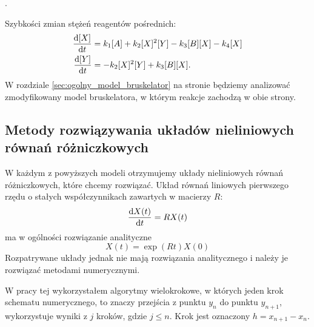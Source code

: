 \documentclass[10pt, a4paper, twoside, onecolumn]{article}
\numberwithin{equation}{section}
\begin{document}
	\begin{center}
		.
	\end{center}
	Szybkości zmian stężeń reagentów pośrednich: 
	\begin{equation}\label{bruskelator_pochodne}
	\begin{split}
		\dv{[X]}{t} &= k_{1}[A]+k_{2}[X]^{2}[Y]-k_{3}[B][X]-k_{4}[X] \\
		\dv{[Y]}{t} &= -k_{2}[X]^{2}[Y]+k_{3}[B][X].
	\end{split}
	\end{equation}
	W rozdziale \ref{sec:ogolny_model_bruskelator} na stronie \pageref{sec:ogolny_model_bruskelator} będziemy analizować zmodyfikowany model bruskelatora, w którym reakcje zachodzą w obie strony. 
	
	\subsection{Metody rozwiązywania układów nieliniowych równań różniczkowych}
	W każdym z powyższych modeli otrzymujemy układy nieliniowych równań różniczkowych, które chcemy rozwiązać. 
	Układ równań liniowych pierwszego rzędu o stałych współczynnikach zawartych w macierzy $R$:
	\begin{equation*}
		\dv{X(t)}{t} = RX(t)
	\end{equation*}
	ma w ogólności rozwiązanie analityczne \cite{palczewski}
	\begin{equation*}
		X(t) = \exp(Rt)X(0)
	\end{equation*}
	Rozpatrywane układy jednak nie mają rozwiązania analitycznego i należy je rozwiązać metodami numerycznymi. \par
	W pracy tej wykorzystałem algorytmy wielokrokowe, w których jeden krok schematu numerycznego, to znaczy przejścia z punktu \(y_{n}\) do punktu \(y_{n+1}\), wykorzystuje wyniki z \(j\) kroków, gdzie \(j\leq n\). Krok jest oznaczony \(h=x_{n+1}-x_{n}\). \par
	
\end{document}
